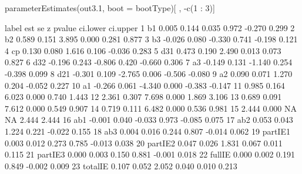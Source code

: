 \begin{Schunk}
\begin{Sinput}
 parameterEstimates(out3.1, boot = bootType)[ , -c(1 : 3)]
\end{Sinput}
\begin{Soutput}
     label    est    se      z pvalue ci.lower ci.upper
1       b1  0.005 0.144  0.035  0.972   -0.270    0.299
2       b2  0.589 0.151  3.895  0.000    0.281    0.877
3       b3 -0.026 0.080 -0.330  0.741   -0.198    0.121
4       cp  0.130 0.080  1.616  0.106   -0.036    0.283
5      d31  0.473 0.190  2.490  0.013    0.073    0.827
6      d32 -0.196 0.243 -0.806  0.420   -0.660    0.306
7       a3 -0.149 0.131 -1.140  0.254   -0.398    0.099
8      d21 -0.301 0.109 -2.765  0.006   -0.506   -0.080
9       a2  0.090 0.071  1.270  0.204   -0.052    0.227
10      a1 -0.266 0.061 -4.340  0.000   -0.383   -0.147
11          0.985 0.164  6.023  0.000    0.740    1.443
12          2.361 0.307  7.698  0.000    1.869    3.106
13          0.689 0.091  7.612  0.000    0.549    0.907
14          0.719 0.111  6.482  0.000    0.536    0.981
15          2.444 0.000     NA     NA    2.444    2.444
16     ab1 -0.001 0.040 -0.033  0.973   -0.085    0.075
17     ab2  0.053 0.043  1.224  0.221   -0.022    0.155
18     ab3  0.004 0.016  0.244  0.807   -0.014    0.062
19 partIE1  0.003 0.012  0.273  0.785   -0.013    0.038
20 partIE2  0.047 0.026  1.831  0.067    0.011    0.115
21 partIE3  0.000 0.003  0.150  0.881   -0.001    0.018
22  fullIE  0.000 0.002  0.191  0.849   -0.002    0.009
23 totalIE  0.107 0.052  2.052  0.040    0.010    0.213
\end{Soutput}
\end{Schunk}
